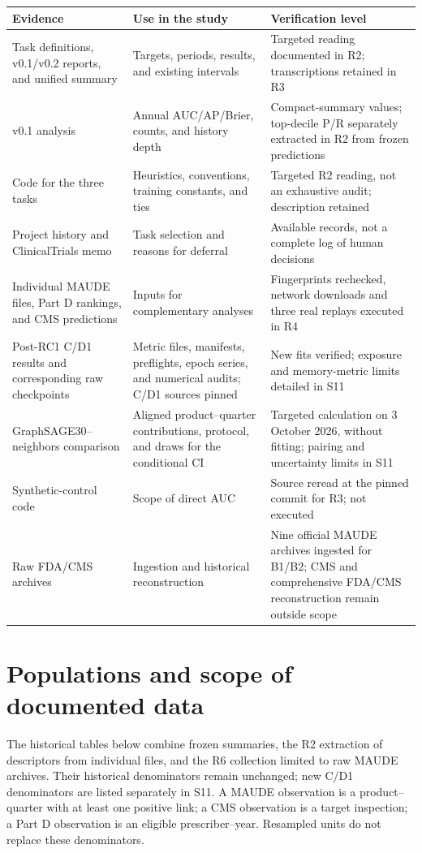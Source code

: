 \documentclass[10pt,a4paper]{article}
\begin{document}
\begin{tabularx}{\linewidth}{@{}p{31mm}Xp{39mm}@{}}
\toprule
Evidence & Use in the study & Verification level\\
\midrule
Task definitions, v0.1/v0.2 reports, and unified summary & Targets, periods, results, and existing intervals & Targeted reading documented in R2; transcriptions retained in R3\\
v0.1 analysis & Annual AUC/AP/Brier, counts, and history depth & Compact-summary values; top-decile P/R separately extracted in R2 from frozen predictions\\
Code for the three tasks & Heuristics, conventions, training constants, and ties & Targeted R2 reading, not an exhaustive audit; description retained\\
Project history and ClinicalTrials memo & Task selection and reasons for deferral & Available records, not a complete log of human decisions\\
Individual MAUDE files, Part D rankings, and CMS predictions & Inputs for complementary analyses & Fingerprints rechecked, network downloads and three real replays executed in R4\\
Post-RC1 C/D1 results and corresponding raw checkpoints & Metric files, manifests, preflights, epoch series, and numerical audits; C/D1 sources pinned & New fits verified; exposure and memory-metric limits detailed in S11\\
GraphSAGE30--neighbors comparison & Aligned product--quarter contributions, protocol, and draws for the conditional CI & Targeted calculation on 3 October 2026, without fitting; pairing and uncertainty limits in S11\\
Synthetic-control code & Scope of direct AUC & Source reread at the pinned commit for R3; not executed\\
Raw FDA/CMS archives & Ingestion and historical reconstruction & Nine official MAUDE archives ingested for B1/B2; CMS and comprehensive FDA/CMS reconstruction remain outside scope\\
\bottomrule
\end{tabularx}



\section{Populations and scope of documented data}
\label{supp:population}
The historical tables below combine frozen summaries, the R2 extraction of descriptors from individual files, and the R6 collection limited to raw MAUDE archives. Their historical denominators remain unchanged; new C/D1 denominators are listed separately in S11. A MAUDE observation is a product--quarter with at least one positive link; a CMS observation is a target inspection; a Part D observation is an eligible prescriber--year. Resampled units do not replace these denominators.
\end{document}
